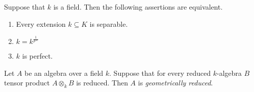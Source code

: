 \begin{corollary}\label{corollary:characterization_of_perfect_fields}
Suppose that $k$ is a field. Then the following assertions are equivalent.
\begin{enumerate}[label=\emph{\textbf{(\roman*)}}, leftmargin=3.0em]
\item Every extension $k\subseteq K$ is separable.
\item $k=k^{\frac{1}{p^{\infty}}}$
\item $k$ is perfect.
\end{enumerate}
\end{corollary}

\begin{definition}
Let $A$ be an algebra over a field $k$. Suppose that for every reduced $k$-algebra $B$ tensor product $A\otimes_kB$ is reduced. Then $A$ is \textit{geometrically reduced}.
\end{definition}

